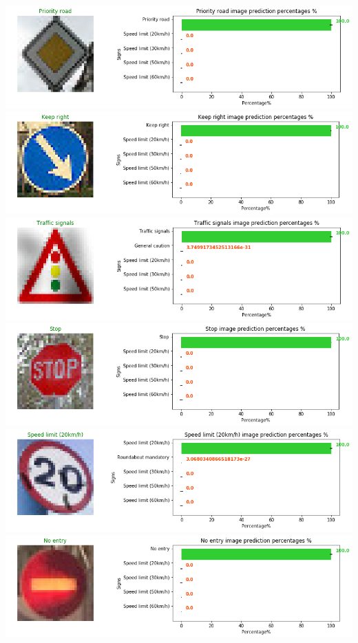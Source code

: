 \documentclass[11pt]{article}
\makeatletter
\def\maxwidth{\ifdim\Gin@nat@width>\linewidth\linewidth
    \else\Gin@nat@width\fi}
\let\Oldincludegraphics\includegraphics
\renewcommand{\includegraphics}[1]{\Oldincludegraphics[width=.8\maxwidth]{#1}}
\makeatother
\begin{document}
\includegraphics{./assets/sm1.png} \includegraphics{./assets/sm2.png}
\includegraphics{./assets/sm3.png} \includegraphics{./assets/sm4.png}
\includegraphics{./assets/sm5.png} \includegraphics{./assets/sm6.png}
\end{document}
